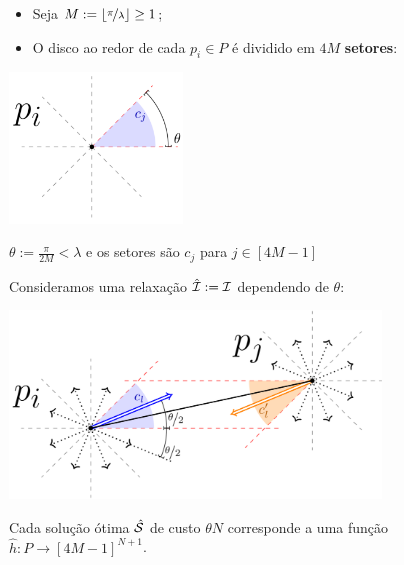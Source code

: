 \begin{frame}{}
    \begin{itemize}[<+->]
        \item Seja $M := \lfloor\nicefrac{\pi}{\lambda}\rfloor \geq 1$;

        \item O disco ao redor de cada $p_i\in P$ é dividido em $4M$ \textbf{setores}:
    \end{itemize}
    
    \bigskip
    \pause
    \begin{minipage}{\linewidth}
        \centering
        \includegraphics[height=4cm]{MSC/angle.png}
    \end{minipage}

    \bigskip
    \centering
    $\theta := \frac{\pi}{2M} < \lambda$ e os setores são $c_j$ para $j \in [4M-1]$
\end{frame}

\begin{frame}{}
    Consideramos uma relaxação ${\hat {\mathcal{I}}:= \mathcal{I}}$ dependendo de $\theta$:
    
    \bigskip
    \pause
    \begin{minipage}{\linewidth}
        \centering
        \includegraphics[height=5cm]{MSC/discrete.png}
    \end{minipage}
\end{frame}

\begin{frame}{}
    \begin{obs}
        Cada solução ótima $\hat{\mathcal{S}}$ de custo $\theta N$ corresponde a uma função \mbox{$\hat h\colon P \to [4M-1]^{N+1}$}.
    \end{obs}
\end{frame}

